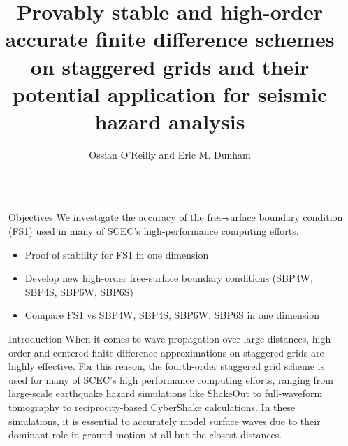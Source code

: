 \documentclass[final]{beamer}
\title{Provably stable and high-order accurate finite difference schemes on staggered grids and their potential application for seismic hazard analysis} %
\author{Ossian O'Reilly and Eric M. Dunham} %
\institute{Department of Geophysics,  Stanford University} %
\newlength{\sepwid}
\newlength{\onecolwid}
\begin{document}

\setlength{\belowcaptionskip}{1ex} %
\setlength\belowdisplayshortskip{2ex} %

\begin{frame}[t] %

\begin{columns}[t] %

\begin{column}{\sepwid}\end{column} %

\begin{column}{\onecolwid} %


\begin{alertblock}{Objectives}
We investigate the accuracy of the free-surface boundary condition (FS1) used in many of SCEC's high-performance
computing efforts. 
\begin{itemize}
  \item Proof of stability for FS1 in one dimension
  \item Develop new high-order free-surface boundary conditions (SBP4W, SBP4S, SBP6W, SBP6S)
  \item Compare FS1 vs SBP4W, SBP4S, SBP6W, SBP6S in one dimension
\end{itemize}

\end{alertblock}


\begin{block}{Introduction}
When it comes to wave propagation over large distances, high-order and centered finite difference
approximations on staggered grids are highly effective. For this reason, the fourth-order staggered grid scheme is used for many of SCEC's high performance computing efforts, ranging from large-scale earthquake hazard simulations like ShakeOut to full-waveform tomography to reciprocity-based CyberShake calculations. In these simulations, it is essential to accurately model surface waves due to their dominant role in ground motion at all but the closest distances. 


\end{block}
\end{column}
\end{columns}
\end{frame}
\end{document}
